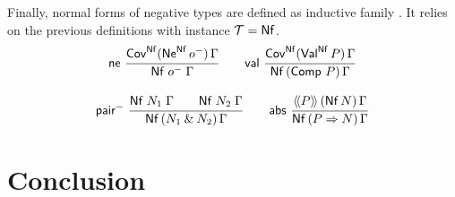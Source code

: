 \documentclass[a4paper,USenglish,cleveref, autoref]{lipics-v2019}
\begin{document}
Finally, normal forms of negative types are defined as inductive
family .  It relies on the previous definitions
with instance $\mathcal{T} = \mathsf{Nf}$.
\begin{gather*}
  \nru{\tne}
      {\Cov[\tNf](\tNe[\tNf]\,\natom)\,\Gamma}
      {\Nf {\natom} \Gamma}
\qquad
  \nru{\tval}
      {\Cov[\tNf](\tVal[\tNf]\,P)\,\Gamma}
      {\NfP {\Comp\,P} \Gamma}
\\[2ex]
  \nru{\npair}
      {\Nf {N_1} \Gamma \qquad \Nf {N_2} \Gamma}
      {\NfP {N_1 \ntimes N_2} \Gamma}
\qquad
  \nru{\tabs}
      {\AddHypP P {\tNf\, N} \Gamma}
      {\NfP {P \To N} \Gamma}
\end{gather*}


\section{Conclusion}
\label{sec:concl}



\end{document}
